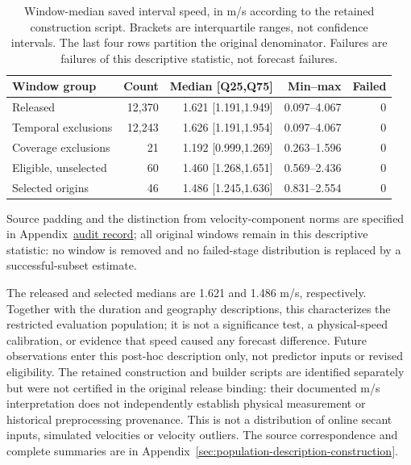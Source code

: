 \begin{table}[htbp]
\centering\small
\caption{Window-median saved interval speed, in m/s according to the retained construction script. Brackets are interquartile ranges, not confidence intervals. The last four rows partition the original denominator. Failures are failures of this descriptive statistic, not forecast failures.}
\label{tab:final-cohort-speeds}\hypertarget{tab:final-cohort-speeds}{}
\begin{tabular}{@{}lrrrr@{}}
\toprule
Window group & Count & Median [Q25,Q75] & Min--max & Failed\\
\midrule
Released & 12,370 & 1.621 [1.191,1.949] & 0.097--4.067 & 0\\
Temporal exclusions & 12,243 & 1.626 [1.191,1.954] & 0.097--4.067 & 0\\
Coverage exclusions & 21 & 1.192 [0.999,1.269] & 0.263--1.596 & 0\\
Eligible, unselected & 60 & 1.460 [1.268,1.651] & 0.569--2.436 & 0\\
Selected origins & 46 & 1.486 [1.245,1.636] & 0.831--2.554 & 0\\
\bottomrule
\end{tabular}
\end{table}

Source padding and the distinction from velocity-component norms are
specified in Appendix~\href{audit-notes.pdf\#sec:source-reconciliation-details}{audit record}; all original
windows remain in this descriptive statistic: no window is removed and no
failed-stage distribution is replaced by a successful-subset estimate.

The released and selected medians are 1.621 and 1.486 m/s, respectively.
Together with the duration and geography descriptions, this characterizes
the restricted evaluation population; it is not a significance test,
a physical-speed calibration, or evidence that speed caused any forecast
difference. Future observations enter this post-hoc description only,
not predictor inputs or revised eligibility. The retained construction and
builder scripts are identified separately but were not certified in the
original release binding: their documented m/s interpretation does not
independently establish physical measurement or historical preprocessing
provenance. This is not a distribution of online secant inputs, simulated
velocities or velocity outliers. The source correspondence and complete
summaries are in Appendix~\ref{sec:population-description-construction}.

